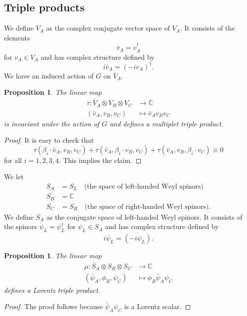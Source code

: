 \documentclass[11pt]{amsart}
\newtheorem{prop}[thm]{Proposition}
\theoremstyle{definition}
\theoremstyle{remark}
\numberwithin{equation}{section}
\begin{document}
\subsection{Triple products}
We define $\overline{V}_A$ as the complex conjugate vector space of $V_A$. It consists of the elements 
\begin{equation*}
\bar{v}_A=v^\dagger_A
\end{equation*}
for $v_A\in V_A$ and has complex structure defined by
\begin{equation*}
i\bar{v}_A=(-iv_A)^\dagger.
\end{equation*}
We have an induced action of $G$ on $\overline{V}_A$.
\begin{prop}\label{prop multiplet triple electroweak}The linear map
\begin{align*}
\tau\colon \overline{V}_A\otimes V_B\otimes V_C&\longrightarrow\mathbb{C}\\
(\bar{v}_A,v_B,v_C)&\longmapsto \bar{v}_Av_Bv_C
\end{align*}
is invariant under the action of $G$ and defines a multiplet triple product.
\end{prop}
\begin{proof}
It is easy to check that
\begin{equation*}
\tau(\beta_i\cdot \bar{v}_A,v_B,v_C)+\tau(\bar{v}_A,\beta_i\cdot v_B,v_C)+\tau(\bar{v}_A,v_B,\beta_i\cdot v_C)\equiv 0
\end{equation*}
for all $i=1,2,3,4$. This implies the claim.
\end{proof}
We let 
\begin{align*}
S_A&=S_L\quad\text{(the space of left-handed Weyl spinors)}\\
S_B&=\mathbb{C}\\
S_C&=S_R\quad \text{(the space of right-handed Weyl spinors).}
\end{align*}
We define $\overline{S}_A$ as the conjugate space of left-handed Weyl spinors. It consists of the spinors $\overline{\psi}_L=\psi_L^\dagger$ for $\psi_L\in S_A$ and has complex structure defined by
\begin{equation*}
i\overline{\psi}_L=\overline{(-i\psi_L)}.
\end{equation*}
\begin{prop}\label{prop lorentz triple electroweak}The linear map
\begin{align*}
\mu\colon \overline{S}_A\otimes S_B\otimes S_C&\longrightarrow\mathbb{C}\\
(\bar{\psi}_A,\phi_B,\psi_C)&\longmapsto \phi_B\bar{\psi}_A\psi_C
\end{align*}
defines a Lorentz triple product.
\end{prop}
\begin{proof}
The proof follows because $\bar{\psi}_A\psi_C$ is a Lorentz scalar.
\end{proof}
\end{document}
